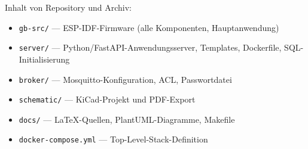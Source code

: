 \documentclass[a4paper,12pt]{article}
\begin{document}
Inhalt von Repository und Archiv:
\begin{itemize}
  \item \texttt{gb-src/} --- ESP-IDF-Firmware (alle Komponenten,
        Hauptanwendung)
  \item \texttt{server/} --- Python/FastAPI-Anwendungsserver, Templates,
        Dockerfile, SQL-Initialisierung
  \item \texttt{broker/} --- Mosquitto-Konfiguration, ACL, Passwortdatei
  \item \texttt{schematic/} --- KiCad-Projekt und PDF-Export
  \item \texttt{docs/} --- LaTeX-Quellen, PlantUML-Diagramme,
        Makefile
  \item \texttt{docker-compose.yml} --- Top-Level-Stack-Definition
\end{itemize}

\end{document}
